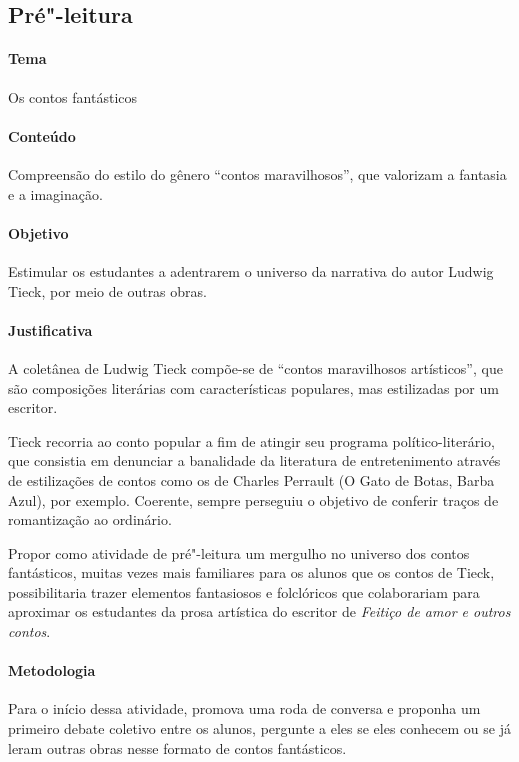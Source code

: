 \documentclass[12pt]{extarticle}
\begin{document}
\subsection{Pré"-leitura}

\paragraph{Tema} Os contos fantásticos

\paragraph{Conteúdo} Compreensão do estilo do gênero ``contos maravilhosos'', 
que valorizam a fantasia e a imaginação. 

\paragraph{Objetivo} Estimular os estudantes a adentrarem o universo da narrativa 
do autor Ludwig Tieck, por meio de outras obras.

\paragraph{Justificativa} A coletânea de Ludwig Tieck compõe-se de ``contos
maravilhosos artísticos'', que são composições literárias com
características populares, mas estilizadas por um escritor.

Tieck recorria ao conto popular
a fim de atingir seu programa político-literário, que consistia
em denunciar a banalidade da literatura de entretenimento
através de estilizações de contos como os de Charles Perrault
(O Gato de Botas, Barba Azul), por exemplo. Coerente, sempre perseguiu
o objetivo de conferir traços de romantização ao ordinário.

Propor como atividade de pré"-leitura um mergulho no universo dos contos 
fantásticos, muitas vezes mais familiares para os alunos que os contos de Tieck, 
possibilitaria trazer elementos fantasiosos e folclóricos que colaborariam para
aproximar os estudantes da prosa artística do escritor de \textit{Feitiço de amor e outros contos}.

\paragraph{Metodologia}
Para o início dessa atividade, promova uma roda de conversa e proponha um primeiro debate
coletivo entre os alunos, pergunte a eles se eles conhecem ou se já leram outras obras 
nesse formato de contos fantásticos.
\end{document}
